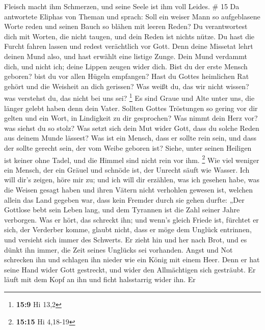 Fleisch macht ihm Schmerzen, und seine Seele ist ihm voll Leides. \# 15
 Da antwortete Eliphas von Theman und sprach: 
Soll ein weiser Mann so aufgeblasene Worte reden und seinen Bauch so
blähen mit leeren Reden?  Du verantwortest dich mit Worten,
die nicht taugen, und dein Reden ist nichts nütze.  Du hast
die Furcht fahren lassen und redest verächtlich vor Gott. 
Denn deine Missetat lehrt deinen Mund also, und hast erwählt eine
listige Zunge.  Dein Mund verdammt dich, und nicht ich;
deine Lippen zeugen wider dich.  Bist du der erste Mensch
geboren? bist du vor allen Hügeln empfangen?  Hast du Gottes
heimlichen Rat gehört und die Weisheit an dich gerissen? 
Was weißt du, das wir nicht wissen? was verstehst du, das nicht bei uns
sei? \footnote{\textbf{15:9} Hi 13,2}  Es sind Graue und
Alte unter uns, die länger gelebt haben denn dein Vater. 
Sollten Gottes Tröstungen so gering vor dir gelten und ein Wort, in
Lindigkeit zu dir gesprochen?  Was nimmt dein Herz vor? was
siehst du so stolz?  Was setzt sich dein Mut wider Gott,
dass du solche Reden aus deinem Munde lässest?  Was ist ein
Mensch, dass er sollte rein sein, und dass der sollte gerecht sein, der
vom Weibe geboren ist?  Siehe, unter seinen Heiligen ist
keiner ohne Tadel, und die Himmel sind nicht rein vor ihm. \footnote{\textbf{15:15}
  Hi 4,18-19}  Wie viel weniger ein Mensch, der ein Gräuel
und schnöde ist, der Unrecht säuft wie Wasser.  Ich will
dir's zeigen, höre mir zu; und ich will dir erzählen, was ich gesehen
habe,  was die Weisen gesagt haben und ihren Vätern nicht
verhohlen gewesen ist,  welchen allein das Land gegeben
war, dass kein Fremder durch sie gehen durfte:  „Der
Gottlose bebt sein Leben lang, und dem Tyrannen ist die Zahl seiner
Jahre verborgen.  Was er hört, das schreckt ihn; und wenn's
gleich Friede ist, fürchtet er sich, der Verderber komme, 
glaubt nicht, dass er möge dem Unglück entrinnen, und versieht sich
immer des Schwerts.  Er zieht hin und her nach Brot, und es
dünkt ihn immer, die Zeit seines Unglücks sei vorhanden. 
Angst und Not schrecken ihn und schlagen ihn nieder wie ein König mit
einem Heer.  Denn er hat seine Hand wider Gott gestreckt,
und wider den Allmächtigen sich gesträubt.  Er läuft mit
dem Kopf an ihn und ficht halsstarrig wider ihn.  Er
